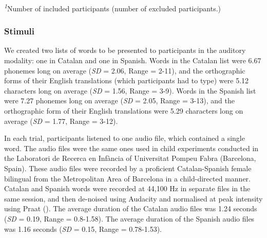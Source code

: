 \documentclass[
]{article}
\begin{document}
\begin{minipage}{\linewidth}
\textsuperscript{\textit{1}}Number of included participants (number of excluded participants.)\\
\end{minipage}

\subsubsection{Stimuli}\label{stimuli}

We created two lists of words to be presented to participants in the
auditory modality: one in Catalan and one in Spanish. Words in the
Catalan list were 6.67 phonemes long on average (\emph{SD} = 2.06, Range
= 2-11), and the orthographic forms of their English translations (which
participants had to type) were 5.12 characters long on average
(\emph{SD} = 1.56, Range = 3-9). Words in the Spanish list were 7.27
phonemes long on average (\emph{SD} = 2.05, Range = 3-13), and the
orthographic form of their English translations were 5.29 characters
long on average (\emph{SD} = 1.77, Range = 3-12).

In each trial, participants listened to one audio file, which contained
a single word. The audio files were the same ones used in child
experiments conducted in the Laboratori de Recerca en Infància of
Universitat Pompeu Fabra (Barcelona, Spain). These audio files were
recorded by a proficient Catalan-Spanish female bilingual from the
Metropolitan Area of Barcelona in a child-directed manner. Catalan and
Spanish words were recorded at 44,100 Hz in separate files in the same
session, and then de-noised using Audacity and normalised at peak
intensity using Praat (). The average duration of the Catalan audio files was
1.24 seconds (\emph{SD} = 0.19, Range = 0.8-1.58). The average duration
of the Spanish audio files was 1.16 seconds (\emph{SD} = 0.15, Range =
0.78-1.53).
\end{document}
